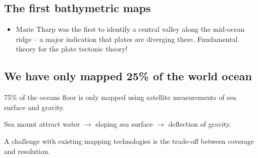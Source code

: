 \subsection{The first bathymetric maps}

\begin{itemize}
    \item Marie Tharp was the first to identify a central valley along the
        mid-ocean ridge -- a major indication that plates are diverging there.
        Fundamental theory for the plate tectonic theory!
\end{itemize}

\subsection{We have only mapped 25\% of the world ocean}

75\% of the oceans floor is only mapped using satellite measurements of sea
surface and gravity.

Sea mount attract water $\rightarrow$ sloping sea surface $\rightarrow$
deflection of gravity.

A challenge with existing mapping technologies is the trade-off between
coverage and resolution.


